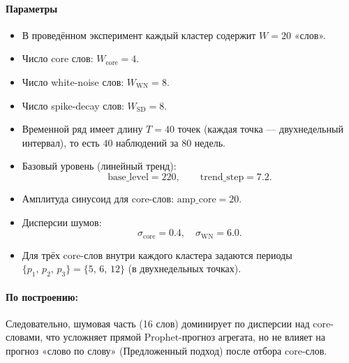 \documentclass[14pt,a4paper]{article}
\begin{document}

\paragraph{Параметры} 
\begin{itemize}
  \item В проведённом эксперимент каждый кластер содержит \(W=20\) «слов». 
  \item Число core слов: \(W_{\mathrm{core}} = 4\). 
  \item Число white-noise слов: \(W_{\mathrm{WN}} = 8\). 
  \item Число spike-decay слов: \(W_{\mathrm{SD}} = 8\). 
  \item Временной ряд имеет длину \(T=40\) точек (каждая точка — двухнедельный интервал), то есть \(40\) наблюдений за 80 недель.
  \item Базовый уровень (линейный тренд): 
    \[
      \text{base\_level} = 220,\qquad \text{trend\_step} = 7.2.
    \]
  \item Амплитуда синусоид для core-слов: 
    \(\displaystyle \text{amp\_core} = 20.\)
  \item Дисперсии шумов: 
    \[
      \sigma_{\mathrm{core}} = 0.4, 
    \quad 
      \sigma_{\mathrm{WN}} = 6.0.
    \]
  \item Для трёх core-слов внутри каждого кластера задаются периоды 
    \(\{p_1,\,p_2,\,p_3\} = \{5,\,6,\,12\}\) (в двухнедельных точках). 
\end{itemize}

\paragraph{По построению:} 
Следовательно, шумовая часть (16 слов) доминирует по дисперсии над core-словами, что усложняет прямой \(\mathrm{Prophet}\)-прогноз агрегата, но не влияет на прогноз «слово по слову» (Предложенный подход) после отбора core-слов.
\end{document}
